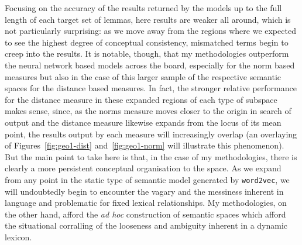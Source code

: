 Focusing on the accuracy of the results returned by the models up to the full length of each target set of lemmas, here results are weaker all around, which is not particularly surprising: as we move away from the regions where we expected to see the highest degree of conceptual consistency, mismatched terms begin to creep into the results.  It is notable, though, that my methodologies outperform the neural network based models across the board, especially for the norm based measures but also in the case of this larger sample of the respective semantic spaces for the distance based measures.  In fact, the stronger relative performance for the distance measure in these expanded regions of each type of subspace makes sense, since, as the norms measure moves closer to the origin in search of output and the distance measure likewise expands from the locus of its mean point, the results output by each measure will increasingly overlap (an overlaying of Figures~\ref{fig:geo1-dist} and~\ref{fig:geo1-norm} will illustrate this phenomenon).  But the main point to take here is that, in the case of my methodologies, there is clearly a more persistent conceptual organisation to the space.  As we expand from any point in the static type of semantic model generated by \texttt{word2vec}, we will undoubtedly begin to encounter the vagary and the messiness inherent in language and problematic for fixed lexical relationships.  My methodologies, on the other hand, afford the \emph{ad hoc} construction of semantic spaces which afford the situational corralling of the looseness and ambiguity inherent in a dynamic lexicon.


